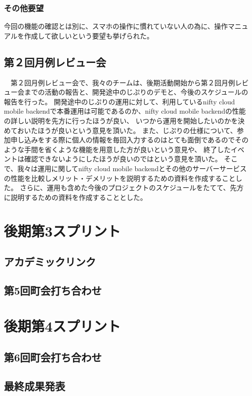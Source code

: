 \subsubsection{その他要望}
今回の機能の確認とは別に、スマホの操作に慣れていない人の為に、操作マニュアルを作成して欲しいという要望も挙げられた。

\subsection{第２回月例レビュー会}
　第２回月例レビュー会で、我々のチームは、後期活動開始から第２回月例レビュー会までの活動の報告と、開発途中のじぷりのデモと、今後のスケジュールの報告を行った。
開発途中のじぷりの運用に対して、利用しているnifty cloud mobile backendで本番運用は可能であるのか、nifty cloud mobile backendの性能の詳しい説明を先方に行ったほうが良い、
いつから運用を開始したいのかを決めておいたほうが良いという意見を頂いた。
また、じぷりの仕様について、参加申し込みをする際に個人の情報を毎回入力するのはとても面倒であるのでそのような手間を省くような機能を用意した方が良いという意見や、
終了したイベントは確認できないようにしたほうが良いのではという意見を頂いた。
そこで、我々は運用に関してnifty cloud mobile backendとその他のサーバーサービスの性能を比較しメリット・デメリットを説明するための資料を作成することした。
さらに、運用も含めた今後のプロジェクトのスケジュールをたてて、先方に説明するための資料を作成することとした。


\section{後期第3スプリント}
\subsection{アカデミックリンク}
\subsection{第5回町会打ち合わせ}

\section{後期第4スプリント}
\subsection{第6回町会打ち合わせ}
\subsection{最終成果発表}
